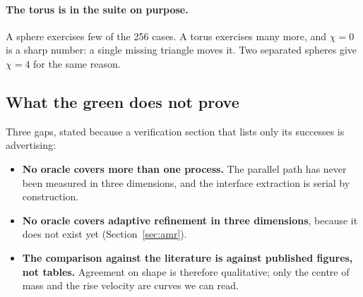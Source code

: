 \paragraph{The torus is in the suite on purpose.}
A sphere exercises few of the 256 cases. A torus exercises many more, and
$\chi = 0$ is a sharp number: a single missing triangle moves it. Two separated
spheres give $\chi = 4$ for the same reason.

\subsection{What the green does not prove}

Three gaps, stated because a verification section that lists only its successes
is advertising:

\begin{itemize}
\item \textbf{No oracle covers more than one process.} The parallel path has
never been measured in three dimensions, and the interface extraction is serial
by construction.
\item \textbf{No oracle covers adaptive refinement in three dimensions},
because it does not exist yet (Section~\ref{sec:amr}).
\item \textbf{The comparison against the literature is against published
figures, not tables.} Agreement on shape is therefore qualitative; only the
centre of mass and the rise velocity are curves we can read.
\end{itemize}
